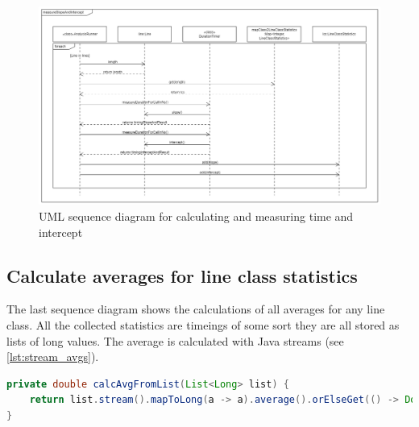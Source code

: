 \begin{landscape}
    \begin{figure}
        \begin{center}
            \includegraphics[width=1.75\textwidth, height=0.99\textheight]{img/seq_slope_intercept.png}
            \caption{UML sequence diagram for calculating and measuring time and intercept}
            \label{fig:seq_slope_intercept}
        \end{center}
    \end{figure}
\end{landscape}

\subsection{Calculate averages for line class statistics}
The last sequence diagram shows the calculations of all averages for any line class. All the collected statistics are timeings of some sort they are all stored as lists of long values. The average is calculated with Java streams (see \ref{lst:stream_avgs}).

\begin{lstlisting}[language=java, caption=Java stream used to calculate average of a list, label=lst:stream_avgs]
private double calcAvgFromList(List<Long> list) {
    return list.stream().mapToLong(a -> a).average().orElseGet(() -> Double.NaN);
}
\end{lstlisting}

